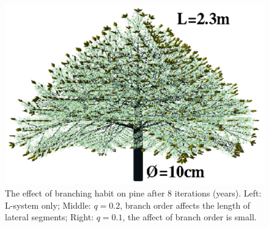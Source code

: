 \begin{figure}
\includegraphics[scale=0.25]{pine8q01h230cmd10cm}   
\caption{The effect of branching habit on pine after 8 iterations (years). 
         Left: L-system only; Middle: $q = 0.2$, branch order affects the length of lateral segments; 
         Right: $q = 0.1$, the affect of branch order is small.}\label{fig:pine}
\end{figure}

